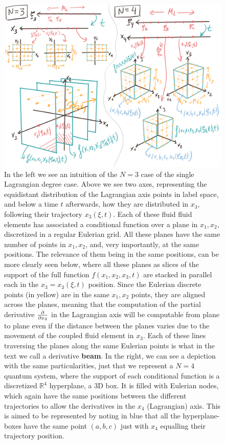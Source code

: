 \documentclass[11pt, a4paper]{article} %
\newcommand{\R}{\mathbb{R}} %
\begin{document}
\begin{figure}[p!]
  \centering
    \includegraphics[width=1\linewidth]{11one_Lagrangian.png}
  \caption{In the left we see an intuition of the $N=3$ case of the single Lagrangian degree case. Above we see two axes, representing the equidistant distribution of the Lagrangian axis points in label space, and below a time $t$ afterwards, how they are distributed in $x_3$, following their trajectory $x_3(\xi,t)$. Each of these fluid fluid elements has associated a conditional function over a plane in $x_1,x_2$, discretized in a regular Eulerian grid. All these planes have the same number of points in $x_1,x_2$, and, very importantly, at the same positions. The relevance of them being in the same positions, can be more clearly seen below, where all these planes as slices of the support of the full function $f(x_1,x_2,x_3,t)$ are stacked in parallel each in the $x_3=x_3(\xi,t)$ position. Since the Eulerian discrete points (in yellow) are in the same $x_1,x_2$ points, they are aligned across the planes, meaning that the computation of the partial derivative $\pdv{}{x_3}$ in the Lagrangian axis will be computable from plane to plane even if the distance between the planes varies due to the movement of the coupled fluid element in $x_3$. Each of these lines traversing the planes along the same Eulerian points is what in the text we call a derivative {\bf beam}. In the right, we can see a depiction with the same particularities, just that we represent a $N=4$ quantum system, where the support of each conditional function is a discretized $\R^4$ hyperplane, a 3D box. It is filled with Eulerian nodes, which again have the same positions between the different trajectories to allow the derivatives in the $x_4$ (Lagrangian) axis. This is aimed to be represented by noting in blue that all the hyperplane-boxes have the same point $(a,b,c)$ just with $x_4$ equalling their trajectory position. }
  \label{fig:hyperplane}
\end{figure}
\end{document}
